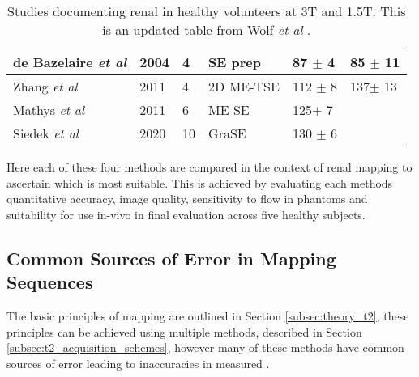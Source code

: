 \begin{table}[H]
\begin{adjustbox}{width=1.0\textwidth, center}
\begin{tabularx}{1.32\textwidth}{XXXXXX}
		\multicolumn{1}{l|}{de Bazelaire \textit{et al} \cite{de_bazelaire_mr_2004}} & \multicolumn{1}{l|}{2004} & \multicolumn{1}{l|}{4}           & \multicolumn{1}{l|}{SE \ttwo prep}   & \multicolumn{1}{l|}{87 $\pm$ 4}        & 85 $\pm$ 11        \\ \hline
		\multicolumn{1}{l|}{Zhang \textit{et al} \cite{zhang_reproducibility_2011}}  & \multicolumn{1}{l|}{2011} & \multicolumn{1}{l|}{4}           & \multicolumn{1}{l|}{2D ME-TSE}       & \multicolumn{1}{l|}{112 $\pm$ 8}       & 137$\pm$ 13        \\ \hline
		\multicolumn{1}{l|}{Mathys \textit{et al} \cite{mathys_t2_2011}}             & \multicolumn{1}{l|}{2011} & \multicolumn{1}{l|}{6}           & \multicolumn{1}{l|}{ME-SE}           & \multicolumn{1}{l|}{125$\pm$ 7}        &                    \\ \hline
		\multicolumn{1}{l|}{Siedek \textit{et al} \cite{siedek_magnetic_2020}}       & \multicolumn{1}{l|}{2020} & \multicolumn{1}{l|}{10}          & \multicolumn{1}{l|}{GraSE}           & \multicolumn{1}{l|}{130 $\pm$ 6}       &                   
	\end{tabularx}
	\end{adjustbox}
	\caption{Studies documenting renal \ttwo in healthy volunteers at 3T and 1.5T. This is an updated table from Wolf \textit{et al} \cite{wolf_magnetic_2018}.}
	\label{tab:t2_lit_values}
\end{table}

\newpage
Here each of these four methods are compared in the context of renal \ttwo mapping to ascertain which is most suitable. This is achieved by evaluating each methods quantitative accuracy, image quality, sensitivity to flow in phantoms and suitability for use in-vivo in final evaluation across five healthy subjects.

\subsection{Common Sources of Error in \ttwo Mapping Sequences}
The basic principles of \ttwo mapping are outlined in Section \ref{subsec:theory_t2}, these principles can be achieved using multiple methods, described in Section \ref{subsec:t2_acquisition_schemes}, however many of these methods have common sources of error leading to inaccuracies in measured \ttwo. 

